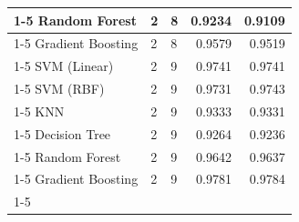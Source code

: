 \begin{table}
\begin{tabular}{lllrr}
\cline{1-5} \cline{2-5}
Random Forest & 2 & 8 & 0.9234 & 0.9109 \\
\cline{1-5} \cline{2-5}
Gradient Boosting & 2 & 8 & 0.9579 & 0.9519 \\
\cline{1-5} \cline{2-5}
SVM (Linear) & 2 & 9 & 0.9741 & 0.9741 \\
\cline{1-5} \cline{2-5}
SVM (RBF) & 2 & 9 & 0.9731 & 0.9743 \\
\cline{1-5} \cline{2-5}
KNN & 2 & 9 & 0.9333 & 0.9331 \\
\cline{1-5} \cline{2-5}
Decision Tree & 2 & 9 & 0.9264 & 0.9236 \\
\cline{1-5} \cline{2-5}
Random Forest & 2 & 9 & 0.9642 & 0.9637 \\
\cline{1-5} \cline{2-5}
Gradient Boosting & 2 & 9 & 0.9781 & 0.9784 \\
\cline{1-5} \cline{2-5}
\bottomrule
\end{tabular}
\end{table}
